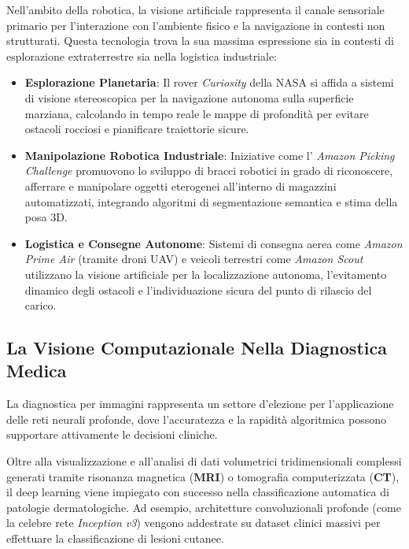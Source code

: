 ﻿\documentclass[11pt, a4paper]{article}
\begin{document}
Nell'ambito della robotica, la visione artificiale rappresenta il canale sensoriale primario per l'interazione con l'ambiente fisico e la navigazione in contesti non strutturati. Questa tecnologia trova la sua massima espressione sia in contesti di esplorazione extraterrestre sia nella logistica industriale:
\begin{itemize}[noitemsep]
    \item \textbf{Esplorazione Planetaria}: Il rover \emph{Curiosity} della NASA si affida a sistemi di visione stereoscopica per la navigazione autonoma sulla superficie marziana, calcolando in tempo reale le mappe di profondità per evitare ostacoli rocciosi e pianificare traiettorie sicure.
    \item \textbf{Manipolazione Robotica Industriale}: Iniziative come l' \emph{Amazon Picking Challenge} promuovono lo sviluppo di bracci robotici in grado di riconoscere, afferrare e manipolare oggetti eterogenei all'interno di magazzini automatizzati, integrando algoritmi di segmentazione semantica e stima della posa 3D.
    \item \textbf{Logistica e Consegne Autonome}: Sistemi di consegna aerea come \emph{Amazon Prime Air} (tramite droni UAV) e veicoli terrestri come \emph{Amazon Scout} utilizzano la visione artificiale per la localizzazione autonoma, l'evitamento dinamico degli ostacoli e l'individuazione sicura del punto di rilascio del carico.
\end{itemize}


\newpage

\subsection{La Visione Computazionale Nella Diagnostica Medica}

La diagnostica per immagini rappresenta un settore d'elezione per l'applicazione delle reti neurali profonde, dove l'accuratezza e la rapidità algoritmica possono supportare attivamente le decisioni cliniche.


Oltre alla visualizzazione e all'analisi di dati volumetrici tridimensionali complessi generati tramite risonanza magnetica (\textbf{MRI}) o tomografia computerizzata (\textbf{CT}), il deep learning viene impiegato con successo nella classificazione automatica di patologie dermatologiche. Ad esempio, architetture convoluzionali profonde (come la celebre rete \emph{Inception v3}) vengono addestrate su dataset clinici massivi per effettuare la classificazione di lesioni cutanee.
\end{document}

